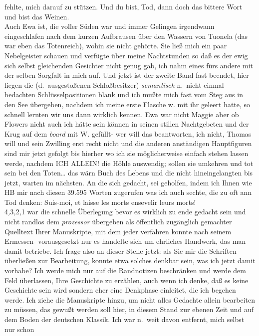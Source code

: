 \documentclass[
]{article}
\begin{document}
fehlte, mich darauf zu stützen. Und du bist, Tod, dann doch das bittere
Wort und bist das Weinen.\\
Auch Ewa ist, die voller Süden war und immer Gelingen irgendwann
eingeschlafen nach dem kurzen Aufbrausen über den Wassern von Tuonela
(das war eben das Totenreich), wohin sie nicht gehörte. Sie ließ mich
ein paar Nebelgeister schauen und verfügte über meine Nachtstunden so
daß es der ewig sich selbst gleichenden Gesichter nicht genug gab, ich
nahm eines fürs andere mit der selben Sorgfalt in mich auf. Und jetzt
ist der zweite Band fast beendet, hier liegen die (d.~ausgestoßenen
Schloßbesitzer) \emph{semantisch} n.~nicht einmal bedachten
Schlüsselpositionen blank und ich mußte mich fast vom Steg aus in den
See übergeben, nachdem ich meine erste Flasche w. mit ihr geleert hatte,
so schnell lernten wir uns dann wirklich kennen. Ewa war nicht Maggie
aber ob Flowers nicht auch ich hätte sein können in seinen stillen
Nachtgebeten und der Krug auf dem \emph{board} mit W. gefüllt- wer will
das beantworten, ich nicht, Thomas will und sein Zwilling erst recht
nicht und die anderen anständigen Hauptfiguren sind mir jetzt gefolgt
bis hierher wo ich sie möglicherweise einfach stehen lassen werde,
nachdem ICH ALLEIN! die Höhle auswendig; sollen sie umkehren und tot
sein bei den Toten\ldots{} das wärn Buch des Lebens und die nicht
hineingelangten bis jetzt, warten im nächsten. An die sich gedacht, sei
geholfen, indem ich Ihnen wie HB mir nach diesen 39.595 Worten zugerufen
was ich auch sechte, die zu oft ann Tod denken: Suis-moi, et laisse les
morts ensevelir leurs morts!\\
4\emph{,}3\emph{,}2\emph{,}1 war die schnelle Überlegung bevor es
wirklich zu ende gedacht sein und nicht randlos dem \emph{prozessor}
übergeben als öffentlich zugänglich gemachter Quelltext Ihrer
Manuskripte, mit dem jeder verfahren konnte nach seinem Ermessen-
vorausgesetzt nur es handelte sich um ehrliches Handwerk, das man damit
betriebe. Ich frage also an dieser Stelle jetzt: als Sie mir die
Schriften überließen zur Bearbeitung, konnte etwa solches denkbar sein,
was ich jetzt damit vorhabe? Ich werde mich nur auf die Randnotizen
beschränken und werde dem Feld überlassen, Ihre Geschichte zu erzählen,
auch wenn ich denke, daß es keine Geschichte sein wird sondern eher eine
Denkphase einleitet, die ich begehen werde. Ich ziehe die Manuskripte
hinzu, um nicht alles Gedachte allein bearbeiten zu müssen, das gewußt
werden soll hier, in diesem Stand zur ebenen Zeit und auf dem Boden der
deutschen Klassik. Ich war n.~weit davon entfernt, mich selbst nur schon
\end{document}

